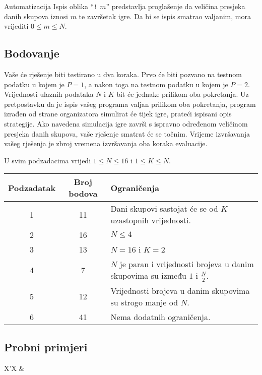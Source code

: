 \begin{statement}[
  problempoints=100,
  timelimit=1 sekunda,
  memorylimit=512 MiB,
]{Automatizacija}
Ispis oblika “\texttt{!} $m$” predstavlja proglašenje da veličina presjeka danih skupova 
iznosi $m$ te završetak igre. 
Da bi se ispis smatrao valjanim, mora vrijediti $0 \leq m \leq N$. 

\subsection*{Bodovanje}

Vaše će rješenje biti testirano u dva koraka. 
Prvo će biti pozvano na testnom podatku u kojem je $P = 1$, a nakon toga 
na testnom podatku u kojem je $P = 2$. 
Vrijednosti ulaznih podataka $N$ i $K$ bit će jednake prilikom oba pokretanja. 
Uz pretpostavku da je ispis vašeg programa valjan prilikom oba pokretanja, 
program izrađen od strane organizatora simulirat će tijek igre, prateći 
ispisani opis strategije. 
Ako navedena simulacija igre završi 
s ispravno određenom veličinom presjeka danih skupova, vaše rješenje 
smatrat će se točnim.
Vrijeme izvršavanja vašeg rješenja je zbroj vremena izvršavanja oba koraka evaluacije. 

U svim podzadacima vrijedi $1 \leq N \leq 16$ i $1 \leq K \leq N$.

{\renewcommand{\arraystretch}{1.4}
  \setlength{\tabcolsep}{6pt}
  \begin{tabular}{ccl}
   Podzadatak & Broj bodova & Ograničenja \\ \midrule
    1 & 11 & Dani skupovi sastojat će se od $K$ uzastopnih vrijednosti. \\
    2 & 16 & $N \leq 4$ \\
    3 & 13 & $N = 16$ i $K = 2$ \\
    4 & 7 & $N$ je paran i vrijednosti brojeva u danim skupovima su između $1$ i $\frac{N}{2}$. \\
    5 & 12 & Vrijednosti brojeva u danim skupovima su strogo manje od $N$. \\
    6 & 41 & Nema dodatnih ograničenja.
\end{tabular}}

\subsection*{Probni primjeri}
\begin{tabularx}{\textwidth}{X'X}
 &
\end{tabularx}


\end{statement}

